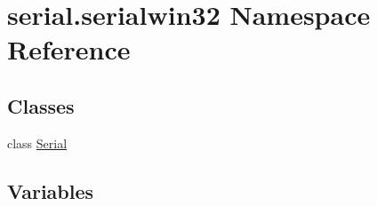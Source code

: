\hypertarget{namespaceserial_1_1serialwin32}{}\section{serial.\+serialwin32 Namespace Reference}
\label{namespaceserial_1_1serialwin32}
\subsection*{Classes}
\begin{DoxyCompactItemize}
\item 
class \hyperlink{classserial_1_1serialwin32_1_1_serial}{Serial}
\end{DoxyCompactItemize}
\subsection*{Variables}
